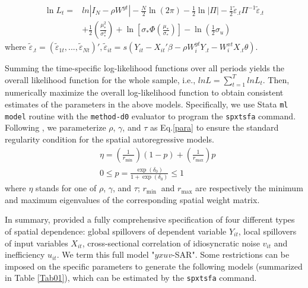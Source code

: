   \begin{equation}\label{gallilik}
	\begin{aligned}
		\ln L_{t}= & ln|I_N - \rho W^{yt}|-\frac{N}{2} \ln (2 \pi)-\frac{1}{2} \ln |\Pi|-\frac{1}{2} \tilde{\varepsilon}_{.t} \Pi^{-1} \tilde{\varepsilon}_{.t} \\
		& +\frac{1}{2}\left(\frac{\mu_{*}^{2}}{\sigma_{*}^{2}}\right)+\ln \left[\sigma_{*} \Phi\left(\frac{\mu_{*}}{\sigma_{*}}\right)\right]-\ln \left(\frac{1}{2}\sigma_{u} \right)
	\end{aligned}
\end{equation}
where $ \tilde{\varepsilon}_{.t} = ( \tilde{\varepsilon}_{1t},..., \tilde{\varepsilon}_{Nt})', \tilde{\varepsilon}_{it}=s(Y_{it}-X_{it}' \beta - \rho W_{i}^{yt}Y_{.t} -W_{i}^{xt}X_{.t} \theta)$. 

Summing the time-specific log-likelihood  functions over all periods yields the overall likelihood function for the whole sample, i.e., $lnL=\sum_{t=1}^TlnL_{t}$. Then, numerically maximize the overall log-likelihood function to obtain consistent estimates of the parameters in the above models.  Specifically, we use Stata {\tt ml model} routine with the {\tt method-d0} evaluator to program the {\tt spxtsfa} command. Following \cite{gude2018heterogeneous}, we parameterize $\rho$, $\gamma$, and $\tau$ as Eq.\eqref{para} to ensure the standard regularity condition for the spatial autoregressive models.
\begin{equation}\label{para}
\begin{aligned}
	& \eta=\left(\frac{1}{r_{\text {min }}}\right)(1-p)+\left(\frac{1}{r_{\max }}\right) p \\
	& 0 \leq p=\frac{\exp \left(\delta_0\right)}{1+\exp \left(\delta_0\right)} \leq 1
\end{aligned}
\end{equation}
where $\eta$ stands for one of $\rho$, $\gamma$, and $\tau$;  $r_{\text {min }}$ and $r_{\text {max}}$ are respectively the minimum and maximum eigenvalues of the corresponding spatial weight matrix. 

In summary, \cite{galli2022spatial} provided a fully comprehensive specification of four different types of spatial dependence: global spillovers of dependent variable $Y_{it}$, local spillovers of input variables $X_{it}$, cross-sectional correlation of idiosyncratic noise  $v_{it}$ and inefficiency $u_{it}$. We term this full model "$yxuv$-SAR". Some restrictions can be imposed on the specific parameters to generate the following  models (summarized in Table \ref{Tab01}), which can be estimated by the {\tt spxtsfa} command.


